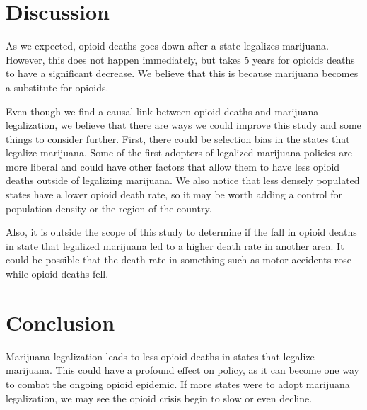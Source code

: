 \documentclass{article}
\begin{document}




\section*{Discussion}

As we expected, opioid deaths goes down after a state legalizes marijuana. However, this does not happen immediately, but takes 5 years for opioids deaths to have a significant decrease. We believe that this is because marijuana becomes a substitute for opioids. 

Even though we find a causal link between opioid deaths and marijuana legalization, we believe that there are ways we could improve this study and some things to consider further. First, there could be selection bias in the states that legalize marijuana. Some of the first adopters of legalized marijuana policies are more liberal and could have other factors that allow them to have less opioid deaths outside of legalizing marijuana. We also notice that less densely populated states have a lower opioid death rate, so it may be worth adding a control for population density or the region of the country.

Also, it is outside the scope of this study to determine if the fall in opioid deaths in state that legalized marijuana led to a higher death rate in another area. It could be possible that the death rate in something such as motor accidents rose while opioid deaths fell.


\section*{Conclusion}

Marijuana legalization leads to less opioid deaths in states that legalize marijuana. This could have a profound effect on policy, as it can become one way to combat the ongoing opioid epidemic. If more states were to adopt marijuana legalization, we may see the opioid crisis begin to slow or even decline. 


\end{document}
